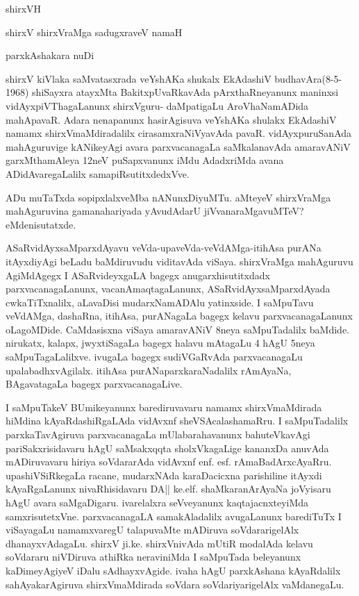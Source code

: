 \newpage
\thispagestyle{empty}
\begin{center}
shirxVH

\smallskip
shirxV shirxVraMga sadugxraveV namaH

\medskip

{\Large parxkAshakara nuDi}
\end{center}

shirxV kiVlaka saMvatasxrada veYshAKa shukalx EkAdashiV budhavAra(8-5-1968) shiSayxra atayxMta BakitxpUvaRkavAda pArxthaRneyanunx maninxsi vidAyxpiVThagaLanunx  shirxVguru- daMpatigaLu AroVhaNamADida mahApavaR. Adara nenapanunx hasirAgisuva veYshAKa shulakx EkAdashiV namamx shirxVmaMdiradalilx cirasamxraNiVyavAda pavaR. vidAyxpuruSanAda mahAguruvige kANikeyAgi avara parxvacanagaLa saMkalanavAda amaravANiV garxMthamAleya 12neV puSapxvanunx iMdu AdadxriMda avana ADidAvaregaLalilx samapiRsutitxdedxVve.

ADu muTaTxda sopipxlalxveMba nANunxDiyuMTu. aMteyeV shirxVraMga mahAguruvina gamanahariyada yAvudAdarU jiVvanaraMgavuMTeV? eMdenisutatxde.

ASaRvidAyxsaMparxdAyavu veVda-upaveVda-veVdAMga-itihAsa purANa itAyxdiyAgi beLadu baMdiruvudu viditavAda viSaya. shirxVraMga mahAguruvu AgiMdAgegx I ASaRvideyxgaLA bagegx anugarxhisutitxdadx parxvacanagaLanunx, vacanAmaqtagaLanunx, ASaRvidAyxsaMparxdAyada cwkaTiTxnalilx, aLavaDisi mudarxNamADAlu yatinxside. I saMpuTavu veVdAMga, dashaRna, itihAsa, purANagaLa bagegx kelavu parxvacanagaLanunx oLagoMDide. CaMdasisxna viSaya amaravANiV 8neya saMpuTadalilx baMdide. nirukatx, kalapx, jwyxtiSagaLa bagegx halavu mAtagaLu 4 hAgU 5neya saMpuTagaLalilxve. ivugaLa bagegx sudiVGaRvAda parxvacanagaLu upalabadhxvAgilalx. itihAsa purANaparxkaraNadalilx rAmAyaNa, BAgavatagaLa bagegx parxvacanagaLive.

I saMpuTakeV BUmikeyanunx barediruvavaru namamx shirxVmaMdirada hiMdina kAyaRdashiRgaLAda vidAvxnf sheVSAcalashamaRru. I saMpuTadalilx parxkaTavAgiruva parxvacanagaLa mUlabarahavanunx bahuteVkavAgi pariSakxrisidavaru hAgU saMsakxqqta sholxVkagaLige kananxDa anuvAda mADiruvavaru hiriya soVdararAda vidAvxnf enf. esf. rAmaBadArxcAyaRru. upashiVSiRkegaLa racane, mudarxNAda karaDacicxna parishiline itAyxdi kAyaRgaLanunx nivaRhisidavaru DA|| ke.elf. shaMkaranArAyaNa joVyisaru hAgU avara saMgaDigaru. ivarelalxra seVveyanunx kaqtajacnxteyiMda samxrisutetxVne.
parxvacanagaLA samakAladalilx avugaLanunx barediTuTx I viSayagaLu namamxvaregU talapuvaMte mADiruva soVdararigelAlx dhanayxvAdagaLu. shirxV ji.ke. shirxVnivAda mUtiR modalAda kelavu soVdararu niVDiruva athiRka neraviniMda I saMpuTada beleyanunx kaDimeyAgiyeV iDalu sAdhayxvAgide. ivaha hAgU parxkAshana kAyaRdalilx sahAyakarAgiruva shirxVmaMdirada soVdara soVdariyarigelAlx vaMdanegaLu.

